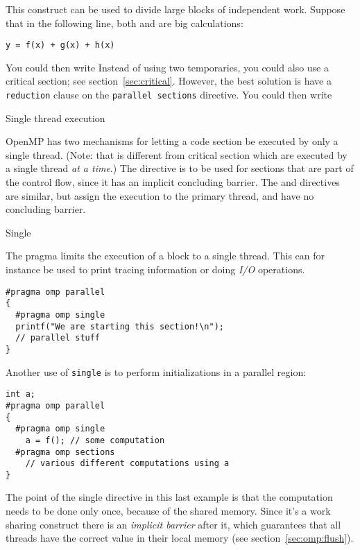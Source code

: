 This construct can be used to divide large blocks of independent work.
Suppose that in the following line, both  and 
are big calculations:
\begin{lstlisting}[language=omp]
  y = f(x) + g(x) + h(x)
\end{lstlisting}
You could then write
Instead of using two temporaries, you could also use a critical
section; see section~\ref{sec:critical}.  However, the best solution
is have a \lstinline[language=omp]{reduction} clause on the \lstinline[language=omp]{parallel sections} directive.
You could then write

 {Single thread execution}
\label{sec:omp-single}

OpenMP has two mechanisms for letting a code section be executed by only
a single thread.
(Note: that is different from critical section which are executed by a single
thread \textsl{at a time}.)
The  directive is to be used for sections
that are part of the control flow, since it has an implicit concluding barrier.
The  and  directives are similar,
but assign the execution to the primary thread, and have no concluding barrier.

 {Single}

The  pragma
limits the execution of a block to a single thread. 
This can for instance be used to print tracing information
or doing \emph{I/O} operations.
\begin{lstlisting}[language=omp]
#pragma omp parallel
{
  #pragma omp single
  printf("We are starting this section!\n");
  // parallel stuff
}
\end{lstlisting}
Another use of \lstinline[language=omp]{single} is to perform initializations
in a parallel region:
\begin{lstlisting}[language=omp]
int a;
#pragma omp parallel
{
  #pragma omp single
    a = f(); // some computation
  #pragma omp sections
    // various different computations using a
}
\end{lstlisting}

The point of the single directive in this last example is that the
computation needs to be done only once, because of the shared memory.
Since it's a work sharing construct there is an \emph{implicit
  barrier} after it,
which guarantees that all threads have the correct value in their
local memory (see section~\ref{sec:omp:flush}).

